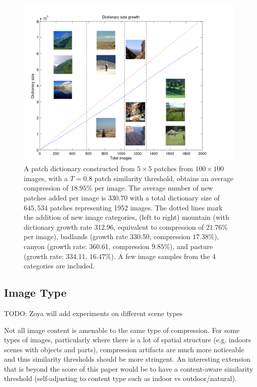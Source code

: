  \begin{figure}
\hspace{-5mm}
\includegraphics[width=1.3\linewidth]{Figures/multiscenes.pdf}
\caption{A patch dictionary constructed from $5\times 5$ patches from $100\times 100$ images, with a $T=0.8$ patch similarity threshold, obtains an average compression of $18.95\%$ per image. The average number of new patches added per image is $330.70$ with a total dictionary size of $645,534$ patches representing 1952 images. The dotted lines mark the addition of new image categories, (left to right) mountain (with dictionary growth rate 312.96, equivalent to compression of $21.76\%$ per image), badlands (growth rate 330.50, compression $17.38\%$), canyon (growth rate: 360.61, compression $9.85\%$), and pasture (growth rate: 334.11, $16.47\%$). A few image samples from the 4 categories are included.}
\label{fig:bigsize}
\end{figure}

\subsection{Image Type}

TODO: Zoya will add experiments on different scene types

Not all image content is amenable to the same type of compression. For some types of images, particularly where there is a lot of spatial structure (e.g. indoors scenes with objects and parts), compression artifacts are much more noticeable and thus similarity thresholds should be more stringent. An interesting extension that is beyond the score of this paper would be to have a content-aware similarity threshold (self-adjusting to content type such as indoor vs outdoor/natural).
